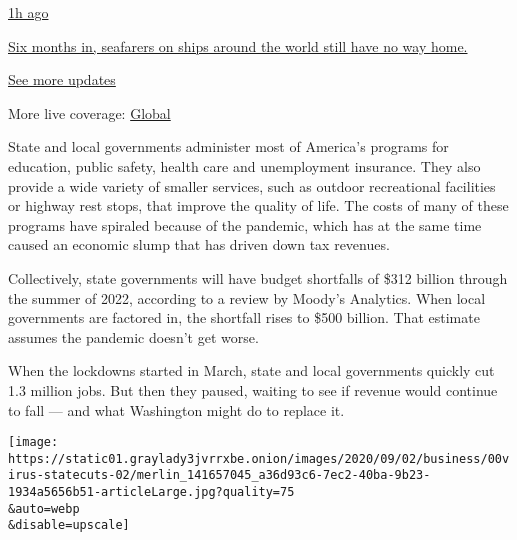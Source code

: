 \href{https://www.nytimes3xbfgragh.onion/live/2020/09/09/business/stock-market-today-coronavirus?action=click\&pgtype=Article\&state=default\&region=MAIN_CONTENT_1\&context=storylines_live_updates\#six-months-in-seafarers-on-ships-around-the-world-still-have-no-way-home}{1h
ago}

\href{https://www.nytimes3xbfgragh.onion/live/2020/09/09/business/stock-market-today-coronavirus?action=click\&pgtype=Article\&state=default\&region=MAIN_CONTENT_1\&context=storylines_live_updates\#six-months-in-seafarers-on-ships-around-the-world-still-have-no-way-home}{Six
months in, seafarers on ships around the world still have no way home.}

\href{https://www.nytimes3xbfgragh.onion/live/2020/09/09/business/stock-market-today-coronavirus?action=click\&pgtype=Article\&state=default\&region=MAIN_CONTENT_1\&context=storylines_live_updates}{See
more updates}

More live coverage:
\href{https://www.nytimes3xbfgragh.onion/2020/09/09/world/covid-19-coronavirus.html?action=click\&pgtype=Article\&state=default\&region=MAIN_CONTENT_1\&context=storylines_live_updates}{Global}

State and local governments administer most of America's programs for
education, public safety, health care and unemployment insurance. They
also provide a wide variety of smaller services, such as outdoor
recreational facilities or highway rest stops, that improve the quality
of life. The costs of many of these programs have spiraled because of
the pandemic, which has at the same time caused an economic slump that
has driven down tax revenues.

Collectively, state governments will have budget shortfalls of \$312
billion through the summer of 2022, according to a review by Moody's
Analytics. When local governments are factored in, the shortfall rises
to \$500 billion. That estimate assumes the pandemic doesn't get worse.

When the lockdowns started in March, state and local governments quickly
cut 1.3 million jobs. But then they paused, waiting to see if revenue
would continue to fall --- and what Washington might do to replace it.

\texttt{[image: https://static01.graylady3jvrrxbe.onion/images/2020/09/02/business/00virus-statecuts-02/merlin\_141657045\_a36d93c6-7ec2-40ba-9b23-1934a5656b51-articleLarge.jpg?quality=75\\\&auto=webp\\\&disable=upscale]}

